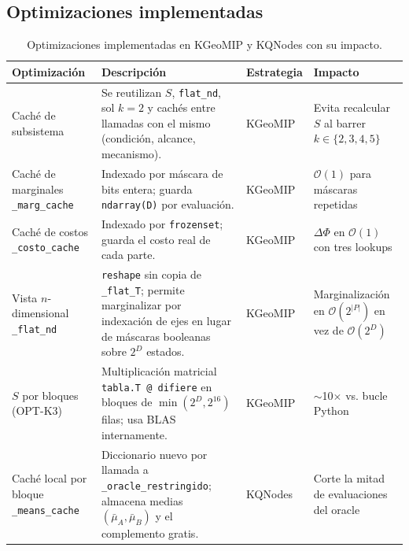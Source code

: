 \subsection{Optimizaciones implementadas}

\begin{table}[H]
  \centering
  \caption{Optimizaciones implementadas en KGeoMIP y KQNodes con su impacto.}
  \label{tab:optimizaciones}
  \begin{tabular}{p{3.2cm} p{4.5cm} p{2.5cm} p{3cm}}
    \toprule
    \textbf{Optimización} & \textbf{Descripción} & \textbf{Estrategia} & \textbf{Impacto} \\
    \midrule
    Caché de subsistema
      & Se reutilizan $S$, \texttt{flat\_nd}, sol $k=2$ y cachés entre llamadas
        con el mismo (condición, alcance, mecanismo).
      & KGeoMIP
      & Evita recalcular $S$ al barrer $k \in \{2,3,4,5\}$ \\[4pt]

    Caché de marginales \texttt{\_marg\_cache}
      & Indexado por máscara de bits entera; guarda \texttt{ndarray(D)} por evaluación.
      & KGeoMIP
      & $\mathcal{O}(1)$ para máscaras repetidas \\[4pt]

    Caché de costos \texttt{\_costo\_cache}
      & Indexado por \texttt{frozenset}; guarda el costo real de cada parte.
      & KGeoMIP
      & $\Delta\Phi$ en $\mathcal{O}(1)$ con tres lookups \\[4pt]

    Vista $n$-dimensional \texttt{\_flat\_nd}
      & \texttt{reshape} sin copia de \texttt{\_flat\_T}; permite marginalizar
        por indexación de ejes en lugar de máscaras booleanas sobre $2^D$ estados.
      & KGeoMIP
      & Marginalización en $\mathcal{O}(2^{|P|})$ en vez de $\mathcal{O}(2^D)$ \\[4pt]

    $S$ por bloques (OPT-K3)
      & Multiplicación matricial \texttt{tabla.T @ difiere} en bloques de
        $\min(2^D, 2^{16})$ filas; usa BLAS internamente.
      & KGeoMIP
      & $\sim$10$\times$ vs. bucle Python \\[4pt]

    Caché local por bloque \texttt{\_means\_cache}
      & Diccionario nuevo por llamada a \texttt{\_oracle\_restringido}; almacena
        medias $(\bar{\mu}_A, \bar{\mu}_B)$ y el complemento gratis.
      & KQNodes
      & Corte la mitad de evaluaciones del oracle \\[4pt]


\end{tabular}
\end{table}
